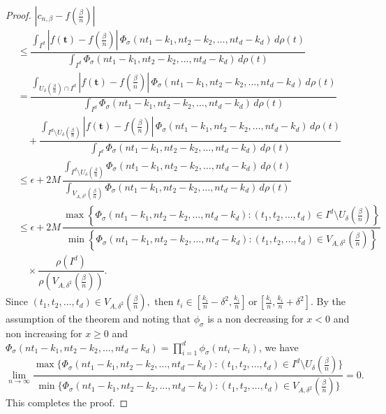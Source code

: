 \documentclass[12pt, reqno]{amsart}
\numberwithin{equation}{section}
\theoremstyle{definition}
\theoremstyle{remark}
\numberwithin{equation}{section}
\begin{document}
\begin{proof}
 \noindent 
 $\displaystyle\left|c_{n,\beta}-f\left(\frac{\beta}{n}\right)\right| $
\begin{align*}
& \leq \dfrac{\int_{I^d}\left|f(\mathbf{t})-f\left(\frac{\beta}{n}\right)\right|\,\Phi_\sigma(nt_1-k_1, nt_2-k_2, \ldots, nt_d-k_d)\,d\rho(t)}{\int_{I^d} \Phi_\sigma(nt_1-k_1, nt_2-k_2, \ldots, nt_d-k_d)\,d\rho(t)} \\
& = \dfrac{\int_{U_{\delta}\left(\frac{\beta}{n}\right) \cap I^d} \left| f(\mathbf{t}) - f\left(\frac{\beta}{n}\right) \right|\,\Phi_\sigma(nt_1-k_1, nt_2-k_2, \ldots, nt_d-k_d)\,d\rho(t)}{\int_{I^d} \Phi_\sigma(nt_1-k_1, nt_2-k_2, \ldots, nt_d-k_d)\,d\rho(t)} \\
& \quad + \dfrac{\int_{I^d \setminus U_{\delta}\left(\frac{\beta}{n}\right)} \left| f(\mathbf{t}) - f\left(\frac{\beta}{n}\right) \right|\, \Phi_\sigma(nt_1-k_1, nt_2-k_2, \ldots, nt_d-k_d)\,d\rho(t)}{\int_{I^d} \Phi_\sigma(nt_1-k_1, nt_2-k_2, \ldots, nt_d-k_d)\,d\rho(t)} \\
& \leq \epsilon + 2M \, \dfrac{\int_{I^d \setminus U_{\delta}\left(\frac{\beta}{n}\right)} \Phi_\sigma(nt_1-k_1, nt_2-k_2, \ldots, nt_d-k_d)\,d\rho(t)}{\int_{V_{A,\delta^2}\left(\frac{\beta}{n}\right)} \Phi_\sigma(nt_1-k_1, nt_2-k_2, \ldots, nt_d-k_d)\,d\rho(t)} \\
& \leq \epsilon + 2M \, \dfrac{\max\left\{ \Phi_\sigma(nt_1-k_1, nt_2-k_2, \ldots, nt_d-k_d) : (t_1, t_2, \ldots, t_d) \in I^d \setminus U_{\delta}\left(\frac{\beta}{n}\right) \right\}}{\min\left\{ \Phi_\sigma(nt_1-k_1, nt_2-k_2, \ldots, nt_d-k_d) : (t_1, t_2, \ldots, t_d) \in V_{A, \delta^2}\left(\frac{\beta}{n}\right) \right\}} \\
& \quad \times \dfrac{\rho(I^d)}{\rho\left( V_{A, \delta^2}\left(\frac{\beta}{n}\right) \right)}.
\end{align*}
Since $(t_1,t_2,\ldots, t_d)\in V_{A, \delta^2}\left(\frac{\beta}{n}\right),$ then $t_i\in [\frac{k_i}{n}-\delta^2, \frac{k_i}{n}]\,\text{or}\, [\frac{k_i}{n}, \frac{k_i}{n}+\delta^2].$ By the assumption of the theorem and noting that $\phi_\sigma$ is a non decreasing for $x<0$ and non increasing for $x\geq0$ and $\Phi_\sigma(nt_1-k_1,nt_2-k_2,\ldots,nt_d-k_d)=\prod_{i=1}^d\phi_\sigma(nt_i-k_i)$, we have 
    $$\lim_{n\to\infty}  \dfrac{ \max\{\Phi_\sigma(nt_1-k_1,nt_2-k_2,\ldots,nt_d-k_d):(t_1, t_2,\ldots, t_d)\in I^d\setminus U_{\delta}\left(\frac{\beta}{n}\right)\}}{\min\{\Phi_\sigma(nt_1-k_1,nt_2-k_2,\ldots,nt_d-k_d):(t_1, t_2,\ldots, t_d)\in V_{A,\delta^2}\left(\frac{\beta}{n}\right)\}}=0.$$
 This completes the proof. 
\end{proof}
\end{document}
